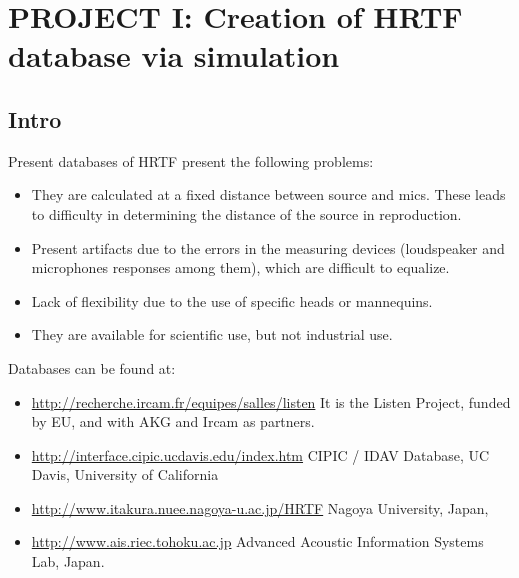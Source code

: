 \documentclass[12pt]{article}
\begin{document}


\section{PROJECT I: Creation of HRTF database via simulation}

\subsection{Intro}

Present databases of HRTF present the following problems:
\begin{itemize}
\item They are calculated at a fixed distance between source and mics. These
leads to difficulty in determining the distance of the source in reproduction.

\item Present artifacts due to the errors in the measuring devices (loudspeaker
and microphones responses among them), which are difficult to equalize.

\item Lack of flexibility due to the use of specific heads or mannequins.

\item They are available for scientific use, but not industrial use.

\end{itemize}

Databases can be found at:

\begin{itemize}
\item \url{http://recherche.ircam.fr/equipes/salles/listen} It is the Listen Project,
funded by EU, and with AKG and Ircam as partners.
\item \url{http://interface.cipic.ucdavis.edu/index.htm} CIPIC / IDAV Database, UC Davis,
University of California
\item \url{http://www.itakura.nuee.nagoya-u.ac.jp/HRTF} Nagoya University, Japan,
\item \url{http://www.ais.riec.tohoku.ac.jp} Advanced Acoustic Information Systems Lab, Japan.
\end{itemize}
\end{document}
